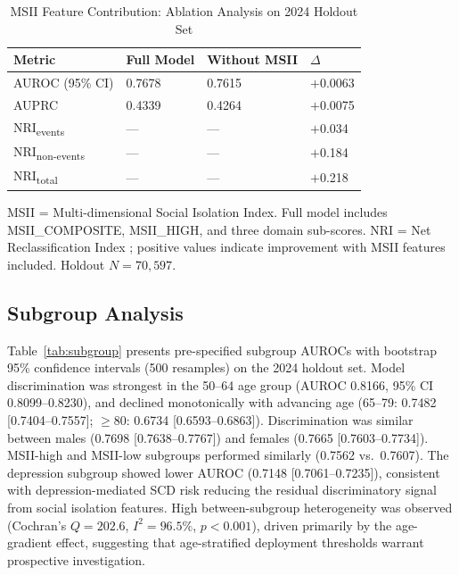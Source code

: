 \documentclass[12pt,a4paper]{article}
\begin{document}
\begin{table}[H]
\centering
\caption{MSII Feature Contribution: Ablation Analysis on 2024 Holdout Set}
\label{tab:ablation}
\small
\begin{tabular}{L{5.5cm} C{2.5cm} C{2.5cm} C{2cm}}
\toprule
\textbf{Metric} & \textbf{Full Model} & \textbf{Without MSII} & \textbf{$\Delta$} \\
\midrule
AUROC (95\% CI) & 0.7678 & 0.7615 & $+$0.0063 \\
AUPRC & 0.4339 & 0.4264 & $+$0.0075 \\
NRI\textsubscript{events} & --- & --- & $+$0.034 \\
NRI\textsubscript{non-events} & --- & --- & $+$0.184 \\
NRI\textsubscript{total} & --- & --- & $+$0.218 \\
\bottomrule
\end{tabular}
\begin{flushleft}
\small MSII = Multi-dimensional Social Isolation Index. Full model includes
MSII\_COMPOSITE, MSII\_HIGH, and three domain sub-scores. NRI = Net
Reclassification Index \cite{Pencina2008}; positive values indicate improvement
with MSII features included. Holdout $N = 70{,}597$.
\end{flushleft}
\end{table}

\subsection{Subgroup Analysis}

Table~\ref{tab:subgroup} presents pre-specified subgroup AUROCs with
bootstrap 95\% confidence intervals (500 resamples) on the 2024 holdout set.
Model discrimination was strongest in the 50--64 age group (AUROC 0.8166,
95\% CI 0.8099--0.8230), and declined monotonically with advancing age
(65--79: 0.7482 [0.7404--0.7557]; $\geq$80: 0.6734 [0.6593--0.6863]).
Discrimination was similar between males (0.7698 [0.7638--0.7767]) and
females (0.7665 [0.7603--0.7734]). MSII-high and MSII-low subgroups performed
similarly (0.7562 vs.\ 0.7607). The depression subgroup showed lower AUROC
(0.7148 [0.7061--0.7235]), consistent with depression-mediated SCD risk
reducing the residual discriminatory signal from social isolation features.
High between-subgroup heterogeneity was observed (Cochran's $Q = 202.6$,
$I^{2} = 96.5\%$, $p < 0.001$), driven primarily by the age-gradient
effect, suggesting that age-stratified deployment thresholds warrant
prospective investigation.
\end{document}
